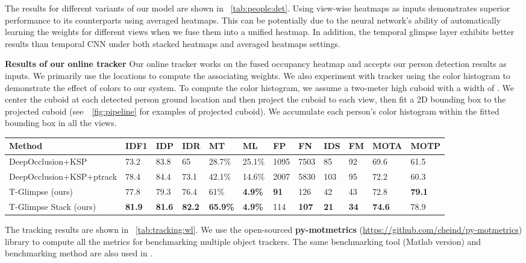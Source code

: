 \documentclass{article}
\begin{document}
The results for different variants of our model are shown in \tablename{~\ref{tab:people:det}}. Using view-wise heatmaps as inputs demonstrates superior performance to its counterparts using averaged
heatmaps. This can be potentially due to the neural network's ability of automatically learning the weights for different views when we fuse them into a unified heatmap.
In addition, the temporal glimpse layer exhibits better results than temporal CNN under both stacked heatmaps and averaged heatmaps settings.

\textbf{Results of our online tracker}
Our online tracker works on the fused occupancy heatmap and accepts our person detection results as inputs.
We primarily use the locations to compute the associating weights. We also experiment with tracker using the color histogram to
demonstrate the effect of colors to our system. To compute the color histogram, we assume a
two-meter high cuboid with a width of . We center the cuboid at each detected person
ground location and then project the cuboid to each view, then fit a 2D bounding box to the projected cuboid (see~\figurename{~\ref{fig:pipeline}} for examples of projected cuboid).
We accumulate each person's color histogram within the fitted bounding box in all the views.


\begin{table*}

	\begin{center}
		\caption{Multiple people tracking results on the WILDTRACK dataset.}
		\label{tab:tracking:wl}
			\scriptsize{
		\begin{tabular}{l|p{0.3cm}p{0.3cm}p{0.3cm}p{0.3cm}p{0.3cm}p{0.3cm}p{0.3cm}p{0.3cm}p{0.3cm}p{0.5cm}p{0.5cm}}
			\hline
			Method	&	IDF1	&	IDP	&	IDR	&	MT	&	ML	&	FP	&	FN	&	IDS	&	FM	&	MOTA	&	MOTP	\\ \hline
			DeepOcclusion+KSP	&	73.2	&	83.8	&	65	&	28.7\%	&	25.1\%	&	1095	&	7503	&	85	&	92	&	69.6	&	61.5	\\
			DeepOcclusion+KSP+ptrack	&	78.4	&	84.4	&	73.1	&	42.1\%	&	14.6\%	&	2007	&	5830	&	103	&	95	&	72.2	&	60.3	\\
			T-Glimpse (ours)	&	77.8	&	79.3	&	76.4	&	61\%	&	\textbf{4.9\%}	&	\textbf{91}	&	126	&	42	&	43	&	72.8	&	\textbf{79.1}	\\
			T-Glimpse Stack (ours)	&	\textbf{81.9}	&	\textbf{81.6}	&	\textbf{82.2}	&	\textbf{65.9\%}	&	\textbf{4.9\%}	&	114	&	\textbf{107}	&	\textbf{21}	&	\textbf{34}	&	\textbf{74.6}	&	78.9	\\
			\hline
		\end{tabular}
		}
	\end{center}
\end{table*}
The tracking results are shown in \tablename~\ref{tab:tracking:wl}. We use the open-sourced \textbf{py-motmetrics} (\url{https://github.com/cheind/py-motmetrics}) library to compute all the metrics
for benchmarking multiple object trackers. The same benchmarking tool (Matlab version) and benchmarking method are also used in \cite{chavdarova2018wildtrack}.
\end{document}
